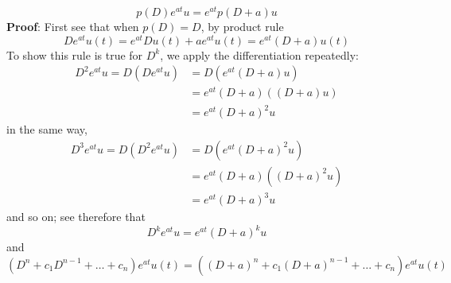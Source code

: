 \documentclass{report}
\begin{document}
\begin{equation*}
p(D)e^{at}u=e^{at}p(D+a)u
\end{equation*}
\textbf{Proof}: First see that when $p(D)=D$, by product rule
\begin{equation*}
De^{at}u(t)=e^{at}Du(t)+ae^{at}u(t)=e^{at}(D+a)u(t)
\end{equation*}
To show this rule is true for $D^k$, we apply the differentiation repeatedly:
\begin{align*}
D^2e^{at}u=D(De^{at}u)&=D(e^{at}(D+a)u)\\
&=e^{at}(D+a)((D+a)u)\\
&=e^{at}(D+a)^2u
\end{align*}
in the same way,
\begin{align*}
D^3e^{at}u=D(D^2e^{at}u)&=D(e^{at}(D+a)^2u)\\
&=e^{at}(D+a)((D+a)^2u)\\
&=e^{at}(D+a)^3u
\end{align*}
and so on; see therefore that 
\begin{equation*}
D^ke^{at}u=e^{at}(D+a)^ku
\end{equation*}
and 
\begin{equation*}
(D^n+c_1D^{n-1}+\ldots+c_n)e^{at}u(t)=((D+a)^n+c_1(D+a)^{n-1}+\ldots+c_n)e^{at}u(t)
\end{equation*}
\newpage
\end{document}
